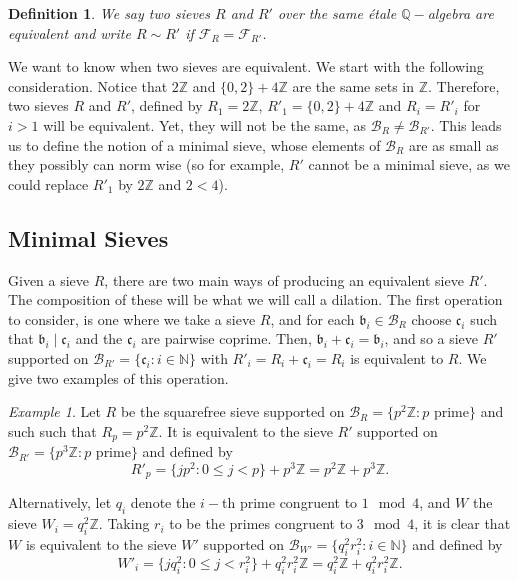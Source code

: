 \documentclass[a4paper,11pt,reqno]{amsart}
\theoremstyle{plain}
\newtheorem{definition}[theorem]{Definition}
\theoremstyle{remark}
\newtheorem{example}[theorem]{Example}
\newcommand{\q}{\mathbb{Q}}
\newcommand{\z}{\mathbb{Z}}
\newcommand{\cb}{\mathcal{B}}
\newcommand{\fr}{\mathcal{F}_R}
\newcommand{\frp}{\mathcal{F}_{R'}}
\newcommand{\gb}{\mathfrak{b}}
\newcommand{\gc}{\mathfrak{c}}
\begin{document}
		\begin{definition}
			\label{def: equivalent sieves}
			We say two sieves $R$ and $R'$ over the same étale $\q-$algebra are \textit{equivalent} and write $R \sim R'$ if $\fr = \frp$.
		\end{definition}
		
		We want to know when two sieves are equivalent. We start with the following consideration. Notice that $2\z$ and $\{0,2\}+4\z$ are the same sets in $\z$. Therefore, two sieves $R$ and $R'$, defined by $R_1 = 2\z$, $R'_1 = \{0,2\}+4\z$ and $R_i = R'_i$ for $i > 1$ will be equivalent. Yet, they will not be the same, as $\cb_R \neq \cb_{R'}$. This leads us to define the notion of a minimal sieve, whose elements of $\cb_R$ are as small as they possibly can norm wise (so for example, $R'$ cannot be a minimal sieve, as we could replace $R'_1$ by $2\z$ and $2<4$).
		
		\subsection{Minimal Sieves}
		
		Given a sieve $R$, there are two main ways of producing an equivalent sieve $R'$. The composition of these will be what we will call a dilation. The first operation to consider, is one where we take a sieve $R$, and for each $\gb_i \in \cb_R$ choose $\gc_i$ such that $\gb_i \mid \gc_i$ and the $\gc_i$ are pairwise coprime. Then, $\gb_i + \gc_i = \gb_i$, and so a sieve $R'$ supported on $\cb_{R'} = \{\gc_i: i \in \mathbb{N}\}$ with $R'_i = R_i + \gc_i = R_i$ is equivalent to $R$. We give two examples of this operation.
		
		\begin{example}
			Let $R$ be the squarefree sieve supported on $\cb_R= \{p^2\z: p \text{ prime}\}$ and such such that $R_p = p^2 \z$. It is equivalent to the sieve $R'$ supported on $\cb_{R'} = \{p^3\z:p \text{ prime}\}$ and defined by $$R'_p = \{jp^2: 0\leq j < p\} + p^3\z = p^2\z + p^3\z  .$$ 
			
			Alternatively, let $q_i$ denote the $i-$th prime congruent to $1 \mod 4$, and $W$ the sieve $W_i = q_i^2\z$. Taking $r_i$ to be the primes congruent to  $3 \mod 4$, it is clear that $W$ is equivalent to the sieve $W'$ supported on $\cb_{W'} = \{q_i^2r_i^2: i \in \mathbb{N}\}$ and defined by $$W'_i  = \{jq_i^2: 0\leq j < r_i^2\} + q_i^2r_i^2\z = q_i^2\z + q_i^2r_i^2\z.$$
		\end{example}
		
\end{document}
